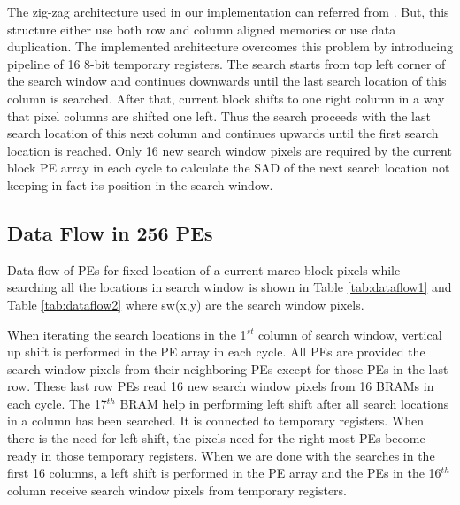 The zig-zag architecture used in our implementation can referred from \cite{fast_vlsi_architecture}. But, this structure either use both row and column aligned memories or use data duplication. The implemented architecture overcomes this problem by introducing pipeline of 16 8-bit temporary registers. The search starts from top left corner of the search window and continues downwards until the last search location of this column is searched. After that, current block shifts to one right column in a way that pixel columns are shifted one left. Thus the search proceeds with the last search location of this next column and continues upwards until the first search location is reached. Only 16 new search window pixels are required by the current block PE array in each cycle to calculate the SAD of the next search location not keeping in fact its position in the search window. \cite{kalaycioglu2011low} 


\subsection{Data Flow in 256 PEs}

Data flow of PEs for fixed location of a current marco block pixels while searching all the locations in search window is shown in Table \ref{tab:dataflow1} and Table \ref{tab:dataflow2} where sw(x,y) are the search window pixels.

When iterating the search locations in the 1$^{st}$ column of search window, vertical up shift is performed in the PE array in each cycle. All PEs are provided the search window pixels from their neighboring PEs except for those PEs in the last row. These last row PEs read 16 new search window pixels from 16 BRAMs in each cycle. The 17$^{th}$ BRAM help in performing left shift after all search locations in a column has been searched. It is connected to temporary registers. When there is the need for left shift, the pixels need for the right most PEs become ready in those temporary registers. When we are done with the searches in the first 16 columns, a left shift is performed in the PE array and the PEs in the 16$^{th}$ column receive search window pixels from temporary registers. \cite{kalaycioglu2011low}

